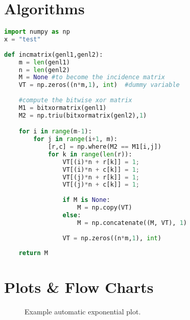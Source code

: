 

\section{Algorithms}

\begin{lstlisting}[language=Python, caption=Python example, label=alg:referenceToAlg]
import numpy as np
x = "test"
    
def incmatrix(genl1,genl2):
    m = len(genl1)
    n = len(genl2)
    M = None #to become the incidence matrix
    VT = np.zeros((n*m,1), int)  #dummy variable
    
    #compute the bitwise xor matrix
    M1 = bitxormatrix(genl1)
    M2 = np.triu(bitxormatrix(genl2),1) 

    for i in range(m-1):
        for j in range(i+1, m):
            [r,c] = np.where(M2 == M1[i,j])
            for k in range(len(r)):
                VT[(i)*n + r[k]] = 1;
                VT[(i)*n + c[k]] = 1;
                VT[(j)*n + r[k]] = 1;
                VT[(j)*n + c[k]] = 1;
                
                if M is None:
                    M = np.copy(VT)
                else:
                    M = np.concatenate((M, VT), 1)
                
                VT = np.zeros((n*m,1), int)
    
    return M
\end{lstlisting}


\section{Plots \& Flow Charts}

\begin{figure}[H]
    \center
    \caption{Example automatic exponential plot.} 
    \label{fig:expPlot}
\end{figure}

